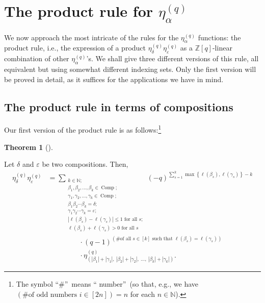 \documentclass[numbers=enddot,12pt,final,onecolumn,notitlepage]{scrartcl}%
\theoremstyle{definition}
\newtheorem{theo}{Theorem}[section]
\newenvironment{theorem}[1][]
{\begin{theo}[#1]\begin{leftbar}}
{\end{leftbar}\end{theo}}
\let\sumnonlimits\sum
\renewcommand{\sum}{\sumnonlimits\limits}
\begin{document}
\section{\label{sec.prod}The product rule for $\eta_{\alpha}^{\left(
q\right)  }$}

We now approach the most intricate of the rules for the $\eta_{\alpha
}^{\left(  q\right)  }$ functions: the product rule, i.e., the expression of a
product $\eta_{\delta}^{\left(  q\right)  }\eta_{\varepsilon}^{\left(
q\right)  }$ as a $\mathbb{Z}\left[  q\right]  $-linear combination of other
$\eta_{\alpha}^{\left(  q\right)  }$'s. We shall give three different versions
of this rule, all equivalent but using somewhat different indexing sets. Only
the first version will be proved in detail, as it suffices for the
applications we have in mind.

\subsection{The product rule in terms of compositions}

Our first version of the product rule is as follows:\footnote{The symbol
\textquotedblleft\#\textquotedblright\ means \textquotedblleft
number\textquotedblright\ (so that, e.g., we have $\left(  \text{\# of odd
numbers }i\in\left[  2n\right]  \right)  =n$ for each $n\in\mathbb{N}$).}


\begin{theorem}
\label{thm.product.1}Let $\delta$ and $\varepsilon$ be two compositions. Then,%
\begin{align*}
\eta_{\delta}^{\left(  q\right)  }\eta_{\varepsilon}^{\left(  q\right)  }  &
=\sum_{\substack{k\in\mathbb{N};\\\beta_{1},\beta_{2},\ldots,\beta_{k}%
\in\operatorname*{Comp};\\\gamma_{1},\gamma_{2},\ldots,\gamma_{k}%
\in\operatorname*{Comp};\\\beta_{1}\beta_{2}\cdots\beta_{k}=\delta
;\\\gamma_{1}\gamma_{2}\cdots\gamma_{k}=\varepsilon;\\\left\vert \ell\left(
\beta_{s}\right)  -\ell\left(  \gamma_{s}\right)  \right\vert \leq1\text{ for
all }s;\\\ell\left(  \beta_{s}\right)  +\ell\left(  \gamma_{s}\right)
>0\text{ for all }s}}\left(  -q\right)  ^{\sum_{s=1}^{k}\max\left\{
\ell\left(  \beta_{s}\right)  ,\ell\left(  \gamma_{s}\right)  \right\}  -k}\\
&  \ \ \ \ \ \ \ \ \ \ \ \ \ \ \ \ \ \ \ \ \cdot\left(  q-1\right)  ^{\left(
\text{\# of all }s\in\left[  k\right]  \text{ such that }\ell\left(  \beta
_{s}\right)  =\ell\left(  \gamma_{s}\right)  \right)  }\\
&  \ \ \ \ \ \ \ \ \ \ \ \ \ \ \ \ \ \ \ \ \cdot\eta_{\left(  \left\vert
\beta_{1}\right\vert +\left\vert \gamma_{1}\right\vert ,\ \left\vert \beta
_{2}\right\vert +\left\vert \gamma_{2}\right\vert ,\ \ldots,\ \left\vert
\beta_{k}\right\vert +\left\vert \gamma_{k}\right\vert \right)  }^{\left(
q\right)  }.
\end{align*}

\end{theorem}
\end{document}
